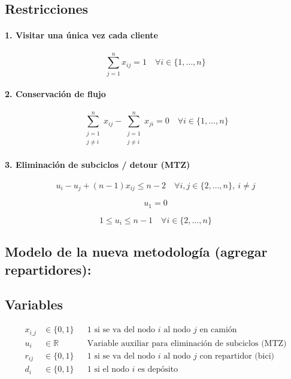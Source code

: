 \documentclass{article}
\begin{document}
\subsection*{Restricciones}

\paragraph{1. Visitar una única vez cada cliente}
\[
\sum_{j=1}^{n} x_{ij} = 1 \quad \forall i \in \{1, \dots, n\}
\]

\paragraph{2. Conservación de flujo}
\[
\sum_{\substack{j=1 \\ j \ne i}}^{n} x_{ij} - \sum_{\substack{j=1 \\ j \ne i}}^{n} x_{ji} = 0 \quad \forall i \in \{1, \dots, n\}
\]

\paragraph{3. Eliminación de subciclos / detour (MTZ)}
\[
u_i - u_j + (n - 1)x_{ij} \leq n - 2 \quad \forall i, j \in \{2, \dots, n\},\ i \ne j
\]

\[
u_1 = 0
\]

\[
1 \leq u_i \leq n - 1 \quad \forall i \in \{2, \dots, n\}
\]

\subsection{Modelo de la nueva metodología (agregar repartidores):} \label{model_repartidores}
\subsection*{Variables}
\begin{align*}
    x_{i\_j} &\in \{0,1\} && \text{1 si se va del nodo } i \text{ al nodo } j \text{ en camión }\\
    u_i &\in \mathbb{R} && \text{Variable auxiliar para eliminación de subciclos (MTZ)} \\
    r_{ij} &\in \{0,1\} && \text{1 si se va del nodo } i \text{ al nodo } j \text{ con repartidor (bici) } \\
    d_{i} &\in \{0,1\} && \text{1 si el nodo $i$ es depósito } 
\end{align*}
\end{document}
